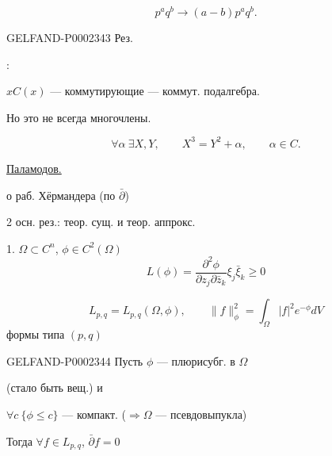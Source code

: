 \begin{equation*}
 p^a q^b\to(a-b)p^a q^b.
\end{equation*}



\begin{GelfandAdjacentEvidence}{GELFAND-P000234}{3}
Рез. 

:

$x$\qquad $C(x)$ — коммутирующие — коммут. подалгебра.
\end{GelfandAdjacentEvidence}



Но это не всегда многочлены.



\begin{equation*}
 \forall\alpha\ \exists X,Y,\qquad X^3=Y^2+\alpha,\qquad \alpha\in C.
\end{equation*}



\underline{Паламодов.}



о раб. Хёрмандера (по $\bar\partial$)



2 осн. рез.: теор. сущ. и теор. аппрокс.



1. $\Omega\subset C^n$, $\phi\in C^2(\Omega)$
\begin{equation*}
 L(\phi)=\frac{\partial^2\phi}{\partial z_j\partial\bar z_k}\xi_j\bar\xi_k\ge0
\end{equation*}



\begin{equation*}
 L_{p,q}=L_{p,q}(\Omega,\phi),\qquad
 \|f\|_\phi^2=\int_\Omega |f|^2e^{-\phi}dV
\end{equation*}
формы типа $(p,q)$



\begin{GelfandAdjacentEvidence}{GELFAND-P000234}{4}
Пусть $\phi$ — плюрисубг. в $\Omega$ 
\end{GelfandAdjacentEvidence}
 (стало быть вещ.) и

$\forall c\ \{\phi\le c\}$ — компакт. ($\Rightarrow\Omega$ — псевдовыпукла)



Тогда $\forall f\in L_{p,q}$, $\bar\partial f=0$



